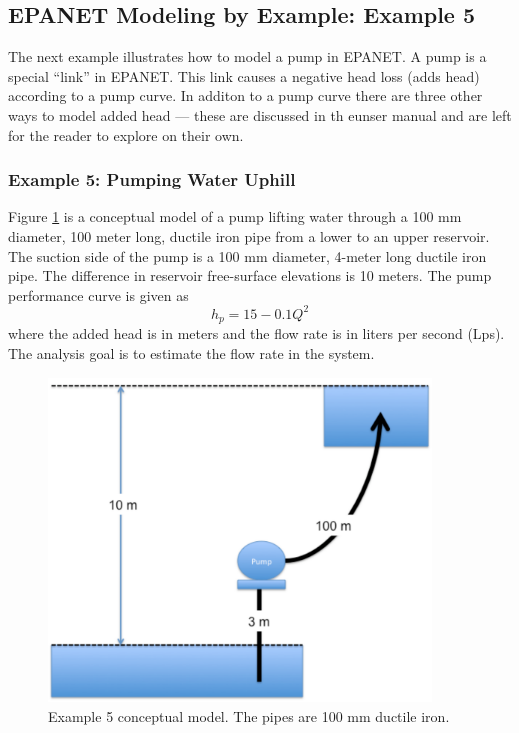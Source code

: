 \subsection{EPANET Modeling by Example:  Example 5}
The next example illustrates how to model a pump in EPANET.  A pump is a special ``link'' in EPANET.  This link causes a negative head loss (adds head) according to a pump curve.  In additon to a pump curve there are three other ways to model added head --- these are discussed in th eunser manual and are left for the reader to explore on their own.
\subsubsection{Example 5: Pumping Water Uphill}
Figure \ref{fig:P2-39.pdf} is a conceptual model of a pump lifting water through a 100 mm diameter, 100 meter long, ductile iron pipe from a lower to an upper reservoir.  The suction side of the pump is a 100 mm diameter, 4-meter long ductile iron pipe.  The difference in reservoir free-surface elevations is 10 meters.  The pump performance curve is given as
\begin{equation}
h_p = 15 - 0.1 Q^2
\end{equation}
where the added head is in meters and the flow rate is in liters per second (Lps).  The analysis goal is to estimate the flow rate in the system.
\begin{figure}[htbp] %
   \centering
   \includegraphics[width=4in]{P2-39.pdf} 
   \caption{Example 5 conceptual model.  The pipes are 100 mm ductile iron.}
   \label{fig:P2-39.pdf}
\end{figure}

